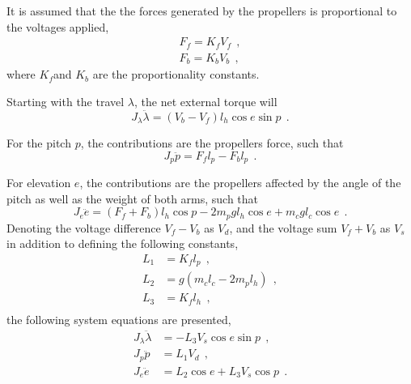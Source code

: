 It is assumed that the the forces generated by the propellers is proportional to the voltages applied,
\begin{equation}
    \begin{split}
        F_f = K_f V_f \: \: ,\\
        F_b = K_b V_b \: \: ,
        \end{split}
\end{equation}
where $K_f$and $K_b$ are the proportionality constants.

Starting with the travel $\lambda$, the net external torque will  
\begin{equation}
    J_{\lambda} \ddot{\lambda} = (V_b - V_f) l_h \cos{e} \sin{p} \: \: .
\end{equation}

For the pitch $p$, the contributions are the propellers force, such that 
\begin{equation}
    J_{p} \ddot{p} = F_f l_p  - F_b l_p  \: \: .
\end{equation}

For elevation $e$, the contributions are the propellers affected by the angle of the pitch as well as the weight of both arms, such that 
\begin{equation}
    J_{e} \ddot{e} = (F_f + F_b)l_h \cos{p} -2 m_p g l_h  \cos{e} + m_c g l_c \cos{e}  \: \: .
\end{equation}
Denoting the voltage difference $V_f - V_b$ as $V_d$, and the voltage sum $V_f + V_b$ as $V_s$ in addition to defining the following constants,
\begin{equation}
    \begin{split}
        L_1 &= K_f l_p \: \: , \\ 
        L_2 &= g(m_c l_c  - 2 m_p l_h) \: \: , \\
        L_3 &= K_f l_h \: \: ,\\ 
    \end{split}
\end{equation}
the following system equations are presented,
\begin{equation}\label{eq:nonlin_heli}
    \begin{split}
        J_{\lambda} \ddot{\lambda} &= -L_3 V_s \cos{e} \sin{p} \: \: ,\\ 
        J_p \ddot{p} &= L_1 V_d \: \: ,\\ 
        J_e \ddot{e} &= L_2 \cos{e} + L_3 V_s \cos{p} \: \: .\\ 
    \end{split}
\end{equation}

